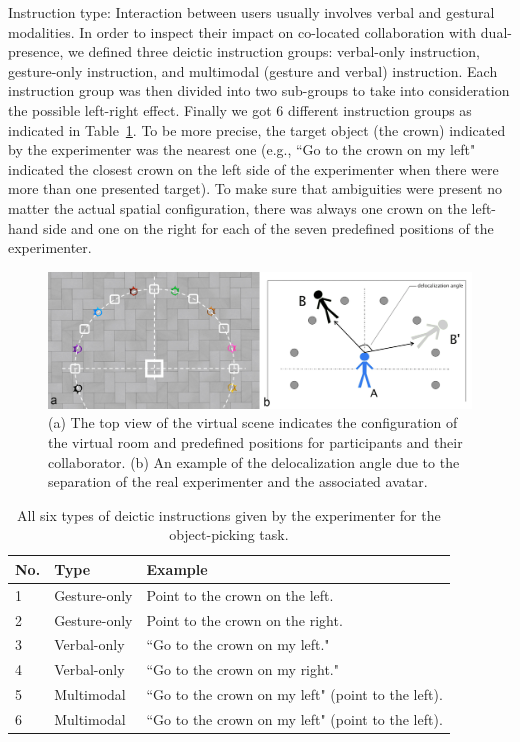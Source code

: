 Instruction type: Interaction between users usually involves verbal and gestural modalities. In order to inspect their impact on co-located collaboration with dual-presence, we defined three deictic instruction groups: verbal-only instruction, gesture-only instruction, and multimodal (gesture and verbal) instruction. Each instruction group was then divided into two sub-groups to take into consideration the possible left-right effect. Finally we got 6 different instruction groups as indicated in Table~\ref{tab:instruction_type}. To be more precise, the target object (the crown) indicated by the experimenter was the nearest one (e.g., ``Go to the crown on my left" indicated the closest crown on the left side of the experimenter when there were more than one presented target). To make sure that ambiguities were present no matter the actual spatial configuration, there was always one crown on the left-hand side and one on the right for each of the seven predefined positions of the experimenter.

\begin{figure}[ht]
  \centering
  \includegraphics[width=\textwidth]{figures/2_floor}
  \caption{\label{fig:2_floor}(a) The top view of the virtual scene indicates the configuration of the virtual room and predefined positions for participants and their collaborator. (b) An example of the delocalization angle due to the separation of the real experimenter and the associated avatar.}
\end{figure}

\begin{table}[!t]
\renewcommand{\arraystretch}{1.3}
\caption{All six types of deictic instructions given by the experimenter for the object-picking task.}
\label{tab:instruction_type}
\centering
\begin{tabular}{l l l}
	\hline
	No. & Type & Example \\
	\hline
    1 & Gesture-only & Point to the crown on the left. \\
    2 & Gesture-only & Point to the crown on the right. \\
    3 & Verbal-only & ``Go to the crown on my left." \\
    4 & Verbal-only & ``Go to the crown on my right." \\
    5 & Multimodal & ``Go to the crown on my left" (point to the left). \\
    6 & Multimodal & ``Go to the crown on my left" (point to the left). \\ \hline
\end{tabular}
\end{table}


